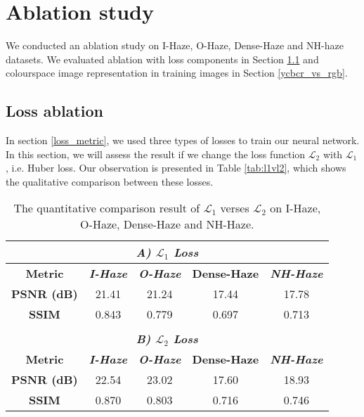 \section{Ablation study}
\label{ablation study}
We conducted an ablation study on I-Haze, O-Haze, Dense-Haze and NH-haze datasets.  We evaluated ablation with loss components in Section \ref{loss_ablation} and colourspace image representation in training images in Section \ref{ycbcr_vs_rgb}.
\subsection{Loss ablation}
\label{loss_ablation}
In section \ref{loss_metric}, we used three types of losses to train our neural network. In this section, we will assess the result if we change the loss function $\mathcal{L}_2$ with $\mathcal{L}_1$, i.e. Huber loss. Our observation is presented in Table \eqref{tab:l1vl2}, which shows the qualitative comparison between these losses.
\begin{table}[h]
\caption{The quantitative comparison result of $\mathcal{L}_1$ verses $\mathcal{L}_2$ on I-Haze, O-Haze, Dense-Haze and NH-Haze.}
    \label{tab:l1vl2}
\centering
    \begin{tabular}{ccccc}
        \multicolumn{5}{c}{\textit{\textbf{A) $\mathcal{L}_1$ Loss}}}   \\ \hline
        \textbf{Metric} & \textit{\textbf{I-Haze}} \cite{i_haze} & \textit{\textbf{O-Haze}} \cite{o_haze} & \textbf{Dense-Haze} \cite{dense_haze} & \textit{\textbf{NH-Haze}} \cite{nh_haze} \\ \hline
        \textbf{PSNR (dB)} & 21.41 & 21.24 & 17.44 & 17.78 \\
        \textbf{SSIM}      & 0.843 & 0.779 & 0.697 & 0.713 \\ \hline
        \multicolumn{5}{l}{}                               \\
        \multicolumn{5}{c}{\textit{\textbf{B) $\mathcal{L}_2$ Loss}}}   \\ \hline
        \textbf{Metric} & \textit{\textbf{I-Haze}} \cite{i_haze} & \textit{\textbf{O-Haze}} \cite{o_haze} & \textbf{Dense-Haze} \cite{dense_haze} & \textit{\textbf{NH-Haze}} \cite{nh_haze}        \\ \hline
        \textbf{PSNR (dB)} & 22.54 & 23.02 & 17.60 & 18.93 \\
        \textbf{SSIM}      & 0.870 & 0.803 & 0.716 & 0.746 \\ \hline
    \end{tabular}
\end{table}


